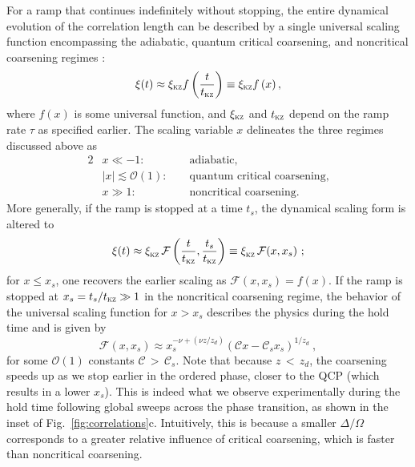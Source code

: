 \documentclass[reprint,twocolumn,secnumarabic,amssymb, aps, prx]{revtex4-2}
\begin{document}
For a ramp that continues indefinitely without stopping, the entire dynamical evolution of the correlation length can be described by a single universal scaling function encompassing the adiabatic, quantum critical coarsening, and noncritical coarsening regimes \cite{Samajdar2024,biroli2010kibble,chandran2012kibble}: 
\begin{equation}
\label{eq:ansatz}
    \xi(t) \approx \xi_{\textsc{kz}} f\left(\frac{t}{t_{\textsc{kz}}} \right) \equiv \xi_{\textsc{kz}} f\left(x \right),
\end{equation}
where $f(x)$ is some universal function, and $\xi_{\textsc{kz}}$ and $t_{\textsc{kz}}$ depend on the ramp rate $\tau$ as specified earlier. The scaling variable $x$ delineates the three regimes discussed above as
\begin{alignat}{2}
\nonumber
    &x\ll -1: &&\mbox{ adiabatic},\\
    &|x|\lesssim \mathcal{O}(1): &&\mbox{ quantum critical coarsening},\\
    \nonumber
    &x\gg1:&& \mbox{ noncritical coarsening}.
\end{alignat}
More generally, if the ramp is stopped at a time $t_s$, the dynamical scaling form is altered to
\begin{equation}
\label{eq:Fgen}
    \xi (t) \approx \xi^{}_{\textsc{kz}}\, \mathcal{F} \left( \frac{t}{t_{\textsc{kz}}}, \frac{t_s}{t_{\textsc{kz}}}\right) \equiv \xi^{}_{\textsc{kz}}\, \mathcal{F}(x,x_s)~;
\end{equation}
for $x\leq x_s$, one recovers the earlier scaling as $\mathcal{F}(x,x_s)=f(x)$.
If the ramp is stopped at $x_s=t_s/t_{\textsc{kz}}\gg 1$ in the noncritical coarsening regime, the behavior of the universal scaling function  for $x>x_s$ describes the physics during the hold time and is given by
\begin{equation}
\label{eq:SFy2}
\mathcal{F}(x, x_s) \approx
    x_s^{-\nu+(\nu z/z_d)}\left(\mathcal{C}x-\mathcal{C}_s x_s\right)^{1/z_d}~, 
\end{equation}
for some $\mathcal{O}(1)$ constants $\mathcal{C}$\,$>$\,$\mathcal{C}_s$.  Note that because $z$\,$<$\,$z_d$, the coarsening speeds up as we stop earlier in the ordered phase, closer to the QCP (which results in a lower $x_s$). This is indeed what we observe experimentally during the hold time following global sweeps across the phase transition, as shown in the inset of Fig.~\ref{fig:correlations}c. Intuitively, this is because a smaller $\Delta/\Omega$ corresponds to a greater relative influence of critical coarsening, which is faster than noncritical coarsening. 
\end{document}
